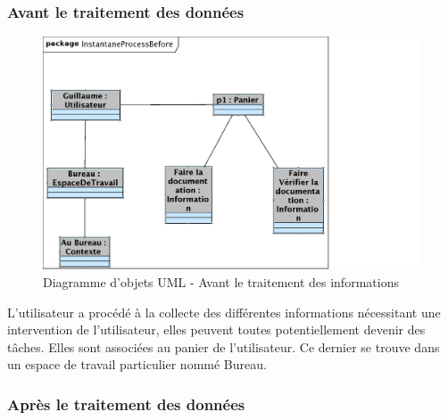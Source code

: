 	\subsubsection{Avant le traitement des données}
	
	\begin{figure}[H]
	\begin{center}
	\includegraphics[scale=0.3]{diagrams/diag_objets_process_before.png}
	\caption{Diagramme d'objets UML  - Avant le traitement des informations}
	\end{center}
	\end{figure}
	
	\bigskip
	
	L'utilisateur a procédé à la collecte des différentes informations nécessitant une intervention de l'utilisateur, elles peuvent toutes potentiellement devenir des tâches. Elles sont associées au panier de l'utilisateur. Ce dernier se trouve dans un espace de travail particulier nommé Bureau.
	
	\subsubsection{Après le traitement des données}
	

